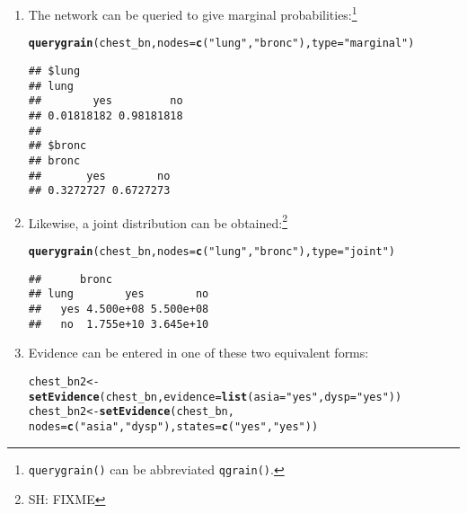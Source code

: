 \documentclass[10pt]{article}\usepackage[]{graphicx}\usepackage[]{color}
\makeatletter
\newcommand{\hlstr}[1]{\textcolor[rgb]{0.192,0.494,0.8}{#1}}%
\newcommand{\hlstd}[1]{\textcolor[rgb]{0.345,0.345,0.345}{#1}}%
\newcommand{\hlkwb}[1]{\textcolor[rgb]{0.69,0.353,0.396}{#1}}%
\newcommand{\hlkwc}[1]{\textcolor[rgb]{0.333,0.667,0.333}{#1}}%
\newcommand{\hlkwd}[1]{\textcolor[rgb]{0.737,0.353,0.396}{\textbf{#1}}}%
\newenvironment{kframe}{%
 \def\at@end@of@kframe{}%
 \ifinner\ifhmode%
  \def\at@end@of@kframe{\end{minipage}}%
  \begin{minipage}{\columnwidth}%
 \fi\fi%
 \def\FrameCommand##1{\hskip\@totalleftmargin \hskip-\fboxsep
 \colorbox{shadecolor}{##1}\hskip-\fboxsep
     \hskip-\linewidth \hskip-\@totalleftmargin \hskip\columnwidth}%
 \MakeFramed {\advance\hsize-\width
   \@totalleftmargin\z@ \linewidth\hsize
   \@setminipage}}%
 {\par\unskip\endMakeFramed%
 \at@end@of@kframe}
\newenvironment{knitrout}{}{} %
\def\code#1{{\texttt{#1}}}
\makeatother
\begin{document}
\begin{enumerate}
\item The network can be queried to give marginal probabilities:\footnote{\code{querygrain()} can be abbreviated \code{qgrain()}.}

\begin{knitrout}
\color{fgcolor}\begin{kframe}
\begin{alltt}
\hlkwd{querygrain}\hlstd{(chest_bn,} \hlkwc{nodes}\hlstd{=}\hlkwd{c}\hlstd{(}\hlstr{"lung"}\hlstd{,} \hlstr{"bronc"}\hlstd{),} \hlkwc{type}\hlstd{=}\hlstr{"marginal"}\hlstd{)}
\end{alltt}
\begin{verbatim}
## $lung
## lung
##        yes         no 
## 0.01818182 0.98181818 
## 
## $bronc
## bronc
##       yes        no 
## 0.3272727 0.6727273
\end{verbatim}
\end{kframe}
\end{knitrout}

\item Likewise, a joint distribution can be obtained:\footnote{SH: FIXME}

\begin{knitrout}
\color{fgcolor}\begin{kframe}
\begin{alltt}
\hlkwd{querygrain}\hlstd{(chest_bn,} \hlkwc{nodes}\hlstd{=}\hlkwd{c}\hlstd{(}\hlstr{"lung"}\hlstd{,} \hlstr{"bronc"}\hlstd{),} \hlkwc{type}\hlstd{=}\hlstr{"joint"}\hlstd{)}
\end{alltt}
\begin{verbatim}
##      bronc
## lung        yes        no
##   yes 4.500e+08 5.500e+08
##   no  1.755e+10 3.645e+10
\end{verbatim}
\end{kframe}
\end{knitrout}

\item Evidence can be entered in one of these two equivalent forms:

\begin{knitrout}
\color{fgcolor}\begin{kframe}
\begin{alltt}
\hlstd{chest_bn2}  \hlkwb{<-} \hlkwd{setEvidence}\hlstd{(chest_bn,} \hlkwc{evidence}\hlstd{=}\hlkwd{list}\hlstd{(}\hlkwc{asia}\hlstd{=}\hlstr{"yes"}\hlstd{,} \hlkwc{dysp}\hlstd{=}\hlstr{"yes"}\hlstd{))}
\hlstd{chest_bn2}  \hlkwb{<-} \hlkwd{setEvidence}\hlstd{(chest_bn,}
                      \hlkwc{nodes}\hlstd{=}\hlkwd{c}\hlstd{(}\hlstr{"asia"}\hlstd{,} \hlstr{"dysp"}\hlstd{),} \hlkwc{states}\hlstd{=}\hlkwd{c}\hlstd{(}\hlstr{"yes"}\hlstd{,} \hlstr{"yes"}\hlstd{))}
\end{alltt}
\end{kframe}
\end{knitrout}


\end{enumerate}
\end{document}
